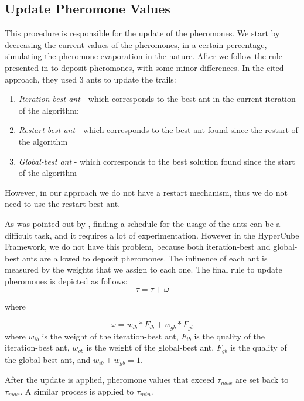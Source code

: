 			\subsection{Update Pheromone Values}
			This procedure is responsible for the update of the pheromones. We start by decreasing the current values of the pheromones, in a certain percentage, simulating the pheromone evaporation in the nature. After we follow the rule presented in \cite{blum04} to deposit pheromones, with some minor differences. In the cited approach, they used 3 ants to update the trails:
			\begin{enumerate}
				\item \emph{Iteration-best ant} - which corresponds to the best ant in the current iteration of the algorithm;
				\item \emph{Restart-best ant} - which corresponds to the best ant found since the restart of the algorithm
				\item \emph{Global-best ant} - which corresponds to the best solution found since the start of the algorithm
			\end{enumerate}
			
			However, in our approach we do not have a restart mechanism, thus we do not need to use the restart-best ant. 

			As was pointed out by \cite{blum04}, finding a schedule for the usage of the ants can be a difficult task, and it requires a lot of experimentation. However in the HyperCube Framework, we do not have this problem, because both iteration-best and global-best ants are allowed to deposit pheromones. The influence of each ant is measured by the weights that we assign to each one. The final rule to update pheromones is depicted as follows:
			\begin{equation}
				\tau = \tau + \omega
			\end{equation}
			
			where
			
			\begin{equation}
				\omega = w_{ib} * F_{ib} + w_{gb} * F_{gb}
			\end{equation}
			where $w_{ib}$ is the weight of the iteration-best ant, $F_{ib}$ is the quality of the iteration-best ant, $w_{gb}$ is the weight of the global-best ant, $F_{gb}$ is the quality of the global best ant, and $w_{ib} + w_{gb} = 1$.
			
			After the update is applied, pheromone values that exceed $\tau_{max}$ are set back to $\tau_{max}$. A similar process is applied to $\tau_{min}$.

